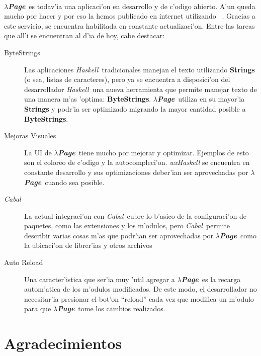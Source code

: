 \documentclass[a4paper]{article}
\newcommand{\haskell}{\textsl{Haskell}}
\newcommand{\hpage}{\textbf{\textsl{$\lambda$Page}}}
\newcommand{\cabal}{\textsl{Cabal}}
\begin{document}
\paragraph{}\hpage\ es todav'ia una aplicaci'on en desarrollo y de c'odigo abierto.  A'un queda mucho por hacer y por eso la hemos publicado en internet utilizando ~\cite{github}.  Gracias a este servicio, se encuentra habilitada  en constante actualizaci'on.  Entre las tareas que all'i se encuentran al d'ia de hoy, cabe destacar:
\begin{description}
	\item[ByteStrings] Las aplicaciones \haskell\ tradicionales manejan el texto utilizando \textbf{Strings} (o sea, listas de caracteres), pero ya se encuentra a disposici'on del desarrollador \haskell\ una nueva herramienta que permite manejar texto de una manera m'as 'optima: \textbf{ByteStrings}.  \hpage\ utiliza en su mayor'ia \textbf{Strings} y podr'ia ser optimizado migrando la mayor cantidad posible a \textbf{ByteStrings}.
	\item[Mejoras Visuales] La UI de \hpage\ tiene mucho por mejorar y optimizar.  Ejemplos de esto son el coloreo de c'odigo y la autocompleci'on.  \textsl{wxHaskell} se encuentra en constante desarrollo y sus optimizaciones deber'ian ser aprovechadas por \hpage\ cuando sea posible.
	\item[\cabal] La actual integraci'on con \cabal\ cubre lo b'asico de la configuraci'on de paquetes, como las extensiones y los m'odulos, pero \cabal\ permite describir varias cosas m'as que podr'ian ser aprovechadas por \hpage\ como la ubicaci'on de librer'ias y otros archivos
	\item[Auto Reload] Una caracter'istica que ser'ia muy 'util agregar a \hpage\ es la recarga autom'atica de los m'odulos modificados.  De este modo, el desarrollador no necesitar'ia presionar el bot'on ``reload'' cada vez que modifica un m'odulo para que \hpage\ tome los cambios realizados.
\end{description}
\newpage
\section{Agradecimientos}
\end{document}
